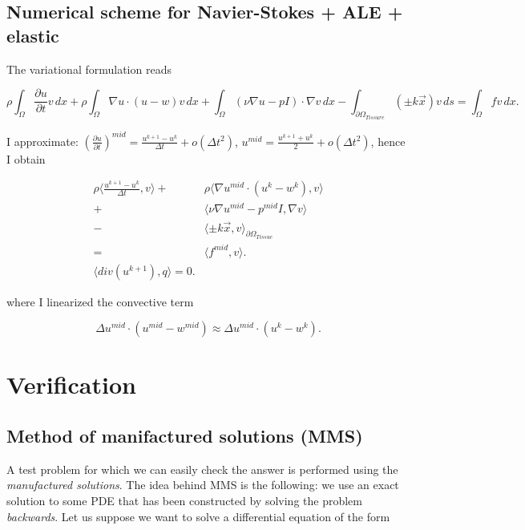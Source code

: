 \documentclass[11pt,a4paper,titlepage]{report}
\begin{document}
\section{Numerical scheme for Navier-Stokes + ALE + elastic}
The variational formulation reads

\[
\rho \int_\Omega \frac{\partial u}{\partial t} v \, dx + \rho \int_\Omega \nabla u \cdot (u-w) v \, dx + \int_\Omega (\nu \nabla u - pI) \cdot \nabla v \, dx - \int_{\partial \Omega_{Tissure}} (\pm k \vec{x}) v \, ds = \int_\Omega f v \, dx.
\]

I approximate: $(\frac{\partial u}{\partial t})^{mid} = \frac{u^{k+1} - u^k}{\Delta t} + o(\Delta t^2)$, $u^{mid} = \frac{u^{k+1} + u^k}{2} + o(\Delta t^2)$, hence I obtain

\[
\begin{aligned}
\rho \langle \frac{u^{k+1} - u^k}{\Delta t}, v \rangle + & \rho \langle \nabla u^{mid} \cdot (u^k - w^k), v \rangle \\
																		+ & \langle \nu \nabla u^{mid} - p^{mid} I, \nabla v \rangle \\
																		- & \langle \pm k \vec{x}, v \rangle_{\partial \Omega_{Tissue}} \\
																		= & \langle f^{mid}, v \rangle . \\
\langle div(u^{k+1}), q \rangle = 0.
\end{aligned}
\]

where I linearized the convective term

\[
\Delta u^{mid} \cdot (u^{mid} - w^{mid}) \approx \Delta u^{mid} \cdot (u^k - w^k).
\]

\chapter{Verification}

\section{Method of manifactured solutions (MMS)}

A test problem for which we can easily check the answer is performed using the \textit{manufactured solutions}. The idea behind MMS is the following: we use an exact solution to some PDE that has been constructed by solving the problem \textit{backwards}. Let us suppose we want to solve a differential equation of the form
\end{document}
